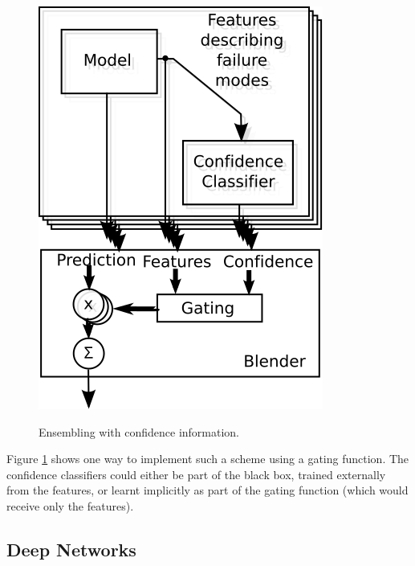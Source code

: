 \documentclass{article}
\begin{document}
\begin{figure}[t]
\vskip 0.2in
\caption{Ensembling with confidence information.}
\vskip 0.1in
\begin{center}
\centerline{\includegraphics{betterblender}}
\label{fig:ensembling-confidence}
\end{center}
\vskip -0.2in
\end{figure} 

Figure \ref{fig:ensembling-confidence} shows one way to implement such a scheme using a gating function.  The confidence classifiers could either be part of the black box, trained externally from the features, or learnt implicitly as part of the gating function (which would receive only the features).

\subsection{Deep Networks}
\end{document}
